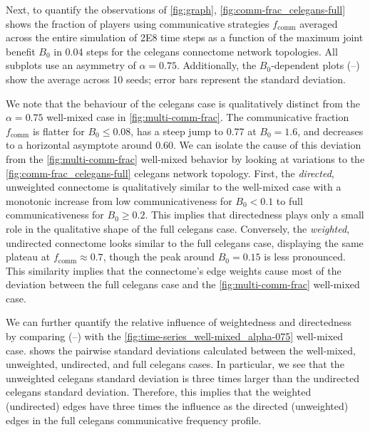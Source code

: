 \documentclass[10pt,letterpaper]{article}
\begin{document}
Next, to quantify the observations of \cref{fig:graph},
\cref{fig:comm-frac_celegans-full} shows the fraction of players
using communicative strategies $f_{\text{comm}}$ averaged across
the entire simulation of \num{2E8} time steps as a function
of the maximum joint benefit $B_0$ in \num{0.04} steps
for the \gls{celegans} connectome network topologies.
All subplots use an asymmetry of $\alpha=0.75$.
Additionally, the $B_0$-dependent plots
(--)
show the average across 10 seeds;
error bars represent the standard deviation.

We note that the behaviour
of the  \gls{celegans} case
is qualitatively distinct
from the $\alpha = 0.75$ well-mixed case in \cref{fig:multi-comm-frac}.
The communicative fraction $f_{\text{comm}}$
is flatter for $B_0 \le 0.08$,
has a steep jump to \num{0.77} at $B_0 = 1.6$,
and decreases to a horizontal asymptote around \num{0.60}.
We can isolate the cause of this deviation
from the \cref{fig:multi-comm-frac} well-mixed
behavior by looking at variations to the \cref{fig:comm-frac_celegans-full}
\gls{celegans} network topology.
First, the 
\emph{directed}, unweighted connectome
is qualitatively similar to the
well-mixed case with a monotonic increase
from low communicativeness for $B_0 < 0.1$
to full communicativeness for $B_0 \ge 0.2$.
This implies that directedness
plays only a small role in the qualitative shape
of the  full \gls{celegans} case.
Conversely,
the 
\emph{weighted}, undirected connectome
looks similar to the 
full \gls{celegans} case,
displaying the same plateau at $f_{\text{comm}} \approx 0.7$,
though the peak around $B_0 = 0.15$ is less pronounced.
This similarity implies that the connectome's edge weights
cause most of the deviation
between the  full \gls{celegans}
case and the \cref{fig:multi-comm-frac} well-mixed case.

We can further quantify the relative influence of weightedness and
directedness by
comparing (--)
with the \cref{fig:time-series_well-mixed_alpha-075} well-mixed case.
 shows the pairwise standard deviations
calculated between the well-mixed, unweighted, undirected, and full
\gls{celegans} cases.
In particular, we see that the unweighted \vs{} \gls{celegans} standard
deviation is three times larger than the undirected \vs{}
\gls{celegans} standard deviation.
Therefore, this implies that the weighted (undirected) edges
have three times the influence as the directed (unweighted) edges
in the full \gls{celegans} communicative frequency profile.
\end{document}
